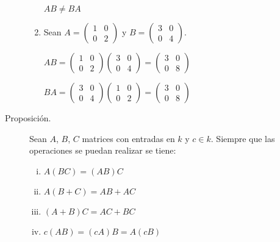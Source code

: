 \documentclass[12pt]{article}
\begin{document}
\begin{description}
\begin{enumerate}
\begin{math}
A B \ne B A
\end{math}

\item
Sean
\begin{math}
A =
\begin{pmatrix}
1 & 0 \\
0 & 2
\end{pmatrix}
\end{math}
 y 
 \begin{math}
B =
\begin{pmatrix}
3 & 0 \\
0 & 4
\end{pmatrix}
\end{math}.

\begin{math}
A B = 
\begin{pmatrix}
1 & 0 \\
0 & 2
\end{pmatrix}
\begin{pmatrix}
3 & 0 \\
0 & 4
\end{pmatrix}
=
\begin{pmatrix}
3 & 0 \\
0 & 8
\end{pmatrix}
\end{math}

\begin{math}
B A = 
\begin{pmatrix}
3 & 0 \\
0 & 4
\end{pmatrix}
\begin{pmatrix}
1 & 0 \\
0 & 2
\end{pmatrix}
=
\begin{pmatrix}
3 & 0 \\
0 & 8
\end{pmatrix}
\end{math}

\end{enumerate}

\item [Proposición.] Sean $A$, $B$, $C$ matrices con entradas en $k$ y $c \in k$. Siempre que las operaciones se puedan realizar se tiene:

\begin{enumerate}[i)]
\item $ A (B C) = (A B) C $
\item $ A (B + C) = A B + A C $
\item $ (A + B) C  = A C + B C $
\item $ c (A B) = (c A) B = A (c B) $
\end{enumerate}


\end{description}
\end{document}
